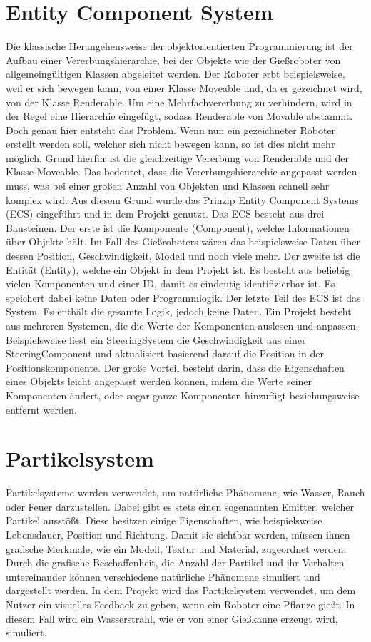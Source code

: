 \section{Entity Component System}
Die klassische Herangehensweise der objektorientierten Programmierung ist der Aufbau einer Vererbungshierarchie, bei der Objekte wie der Gießroboter von allgemeingültigen Klassen abgeleitet werden. Der Roboter erbt beispielsweise, weil er sich bewegen kann, von einer Klasse Moveable und, da er gezeichnet wird, von der Klasse Renderable. Um eine Mehrfachvererbung zu verhindern, wird in der Regel eine Hierarchie eingefügt, sodass Renderable von Movable abstammt. Doch genau hier entsteht das Problem. Wenn nun ein gezeichneter Roboter erstellt werden soll, welcher sich nicht bewegen kann, so ist dies nicht mehr möglich. Grund hierfür ist die gleichzeitige Vererbung von Renderable und der Klasse Moveable. Das bedeutet, dass die Vererbungshierarchie angepasst werden muss, was bei einer großen Anzahl von Objekten und Klassen schnell sehr komplex wird. Aus diesem Grund wurde das Prinzip Entity Component Systems (ECS) eingeführt und in dem Projekt genutzt.
Das ECS besteht aus drei Bausteinen. Der erste ist die Komponente (Component), welche Informationen über Objekte hält. Im Fall des Gießroboters wären das beispielsweise Daten über dessen Position, Geschwindigkeit, Modell und noch viele mehr. Der zweite ist die Entität (Entity), welche ein Objekt in dem Projekt ist. Es besteht aus beliebig vielen Komponenten und einer ID, damit es eindeutig identifizierbar ist. Es speichert dabei keine Daten oder Programmlogik. Der letzte Teil des ECS ist das System. Es enthält die gesamte Logik, jedoch keine Daten. Ein Projekt besteht aus mehreren Systemen, die die Werte der Komponenten auslesen und anpassen. 
Beispielsweise liest ein SteeringSystem die Geschwindigkeit aus einer SteeringComponent und aktualisiert basierend darauf die Position in der Positionskomponente. Der große Vorteil besteht darin, dass die Eigenschaften eines Objekts leicht angepasst werden können, indem die Werte seiner Komponenten ändert, oder sogar ganze Komponenten hinzufügt beziehungsweise entfernt werden.
\section{Partikelsystem}
Partikelsysteme werden verwendet, um natürliche Phänomene, wie Wasser, Rauch oder Feuer darzustellen. Dabei gibt es stets einen sogenannten Emitter, welcher Partikel ausstößt. Diese besitzen einige Eigenschaften, wie beispielsweise Lebensdauer, Position und Richtung. Damit sie sichtbar werden, müssen ihnen grafische Merkmale, wie ein Modell, Textur und Material, zugeordnet werden. Durch die grafische Beschaffenheit, die Anzahl der Partikel und ihr Verhalten untereinander können verschiedene natürliche Phänomene simuliert und dargestellt werden. In dem Projekt wird das Partikelsystem verwendet, um dem Nutzer ein visuelles Feedback zu geben, wenn ein Roboter eine Pflanze gießt. In diesem Fall wird ein Wasserstrahl, wie er von einer Gießkanne erzeugt wird, simuliert.

